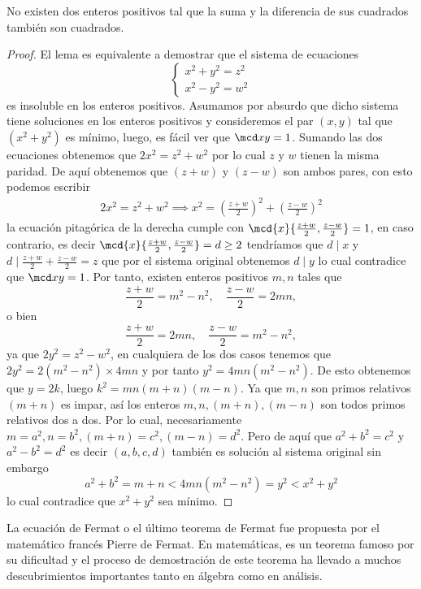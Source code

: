 \begin{lemma}
    No existen dos enteros positivos tal que la suma y la diferencia de sus cuadrados también son cuadrados.
\end{lemma}
\begin{proof}
    El lema es equivalente a demostrar que el sistema de ecuaciones
    \[
        \begin{cases}
            x^2 + y^2 = z^2\\
            x^2 - y^2 = w^2
        \end{cases}
    \]
    es insoluble en los enteros positivos.
    Asumamos por absurdo que dicho sistema tiene soluciones en los enteros positivos y consideremos el par $(x,y)$ tal que
    $(x^2 + y^2)$ es mínimo, luego, es fácil ver que $\mcd x y = 1$.
    Sumando las dos ecuaciones obtenemos que $2x^2 = z^2 + w^2$ por lo cual $z$ y $w$ tienen la misma paridad.
    De aquí obtenemos que $(z + w)$ y $(z - w)$ son ambos pares, con esto podemos escribir
    \begin{align*}
        2x^2 = z^2 + w^2 \implies x^2 = \left(\frac{z + w}{2}\right)^2 + \left(\frac{z - w}{2}\right)^2
    \end{align*}
    la ecuación pitagórica de la derecha cumple con $\mcd{x}{\frac{z + w}{2}, \frac{z - w}{2}} = 1$, en caso contrario, es decir
    $\mcd{x}{\frac{z + w}{2}, \frac{z - w}{2}} = d \geq 2$ tendríamos que $d \mid x$ y $d \mid \frac{z + w}{2} + \frac{z - w}{2} = z$
    que por el sistema original obtenemos $d \mid y$ lo cual contradice que $\mcd x y = 1$.
    Por tanto, existen enteros positivos $m,n$ tales que
    \[
        \frac{z + w}{2} = m^2 - n^2, \quad \frac{z - w}{2} = 2mn,
    \]
    o bien
    \[
        \frac{z + w}{2} = 2mn, \quad \frac{z - w}{2} = m^2 - n^2,
    \]
    ya que $2y^2 = z^2 - w^2$, en cualquiera de los dos casos tenemos que $2y^2 = 2(m^2 - n^2)\times 4mn$ y por tanto
    $y^2 = 4mn(m^2 - n^2)$.
    De esto obtenemos que $y = 2k$, luego $k^2 = mn(m + n)(m - n)$.
    Ya que $m,n$ son primos relativos $(m + n)$ es impar, así los enteros $m, n, (m + n), (m - n)$ son todos primos relativos dos a dos.
    Por lo cual, necesariamente $m = a^2, n = b^2, (m + n) = c^2, (m - n) = d^2$.
    Pero de aquí que $a^2 + b^2 = c^2$ y $a^2 - b^2 = d^2$ es decir $(a,b,c,d)$ también es solución al sistema original
    sin embargo
    \[
        a^2 + b^2 = m + n < 4mn(m^2 - n^2) = y^2 < x^2 + y^2
    \]
    lo cual contradice que $x^2 + y^2$ sea mínimo.
\end{proof}

La ecuación de Fermat o el último teorema de Fermat fue propuesta por el matemático francés Pierre de Fermat.
En matemáticas, es un teorema famoso por su dificultad y el proceso de demostración de este teorema ha llevado a muchos descubrimientos importantes tanto en álgebra como en análisis.

